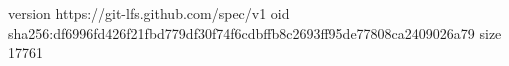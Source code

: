 version https://git-lfs.github.com/spec/v1
oid sha256:df6996fd426f21fbd779df30f74f6cdbffb8c2693ff95de77808ca2409026a79
size 17761
